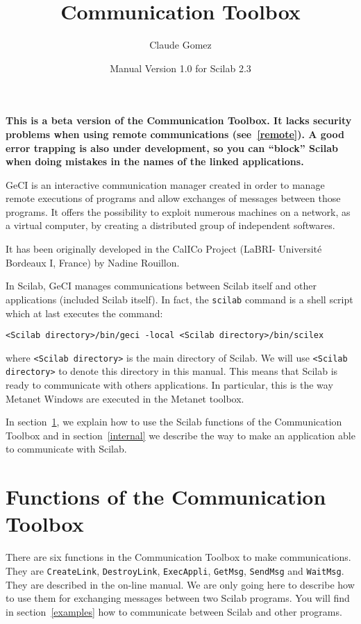 \documentclass[11pt]{article}
\title{Communication Toolbox}
\author{Claude Gomez}
\date{Manual Version 1.0 for Scilab 2.3}
\newcommand{\func}[1]{\texttt{#1}}
\newcommand{\T}[1]{\texttt{#1}}
\begin{document}
\maketitle

\small\textbf{
This is a beta version of the Communication Toolbox. It lacks security
problems when using remote communications (see~\ref{remote}). A good
error trapping is also under development, so you can ``block'' Scilab
when doing mistakes in the names of the linked applications.
}

\bigskip

GeCI is an interactive communication manager created in order to
manage remote executions of programs and allow exchanges of messages
between those programs. It offers the possibility to exploit numerous
machines on a network, as a virtual computer, by creating a
distributed group of independent softwares.

It has been originally developed in the CalICo Project (LaBRI-
Universit\'e Bordeaux I, France) by Nadine Rouillon.

In Scilab, GeCI manages communications between Scilab itself and other
applications (included Scilab itself). In fact, the \T{scilab}
command is a shell script which at last executes the command:

\begin{verbatim}
<Scilab directory>/bin/geci -local <Scilab directory>/bin/scilex
\end{verbatim}

where \verb|<Scilab directory>| is the main directory of Scilab.
We will use  \verb|<Scilab directory>| to denote this directory in
this manual.
This means that Scilab is ready to communicate with others
applications. In particular, this is the way Metanet Windows are
executed in the Metanet toolbox.

In section~\ref{functions}, we explain how to use the Scilab functions of the
Communication Toolbox and in section~\ref{internal} we describe the
way to make an application able to communicate with Scilab.

\section{Functions of the Communication Toolbox}\label{functions}

There are six functions in the Communication Toolbox to make
communications. They are 
\func{CreateLink}, \func{DestroyLink}, \func{ExecAppli},
\func{GetMsg}, \func{SendMsg} and \func{WaitMsg}. They are described
in the on-line manual. We are only going here to describe how to use
them for exchanging messages between two Scilab programs. You will find
in section~\ref{examples} how to communicate between Scilab and other
programs.
\end{document}
